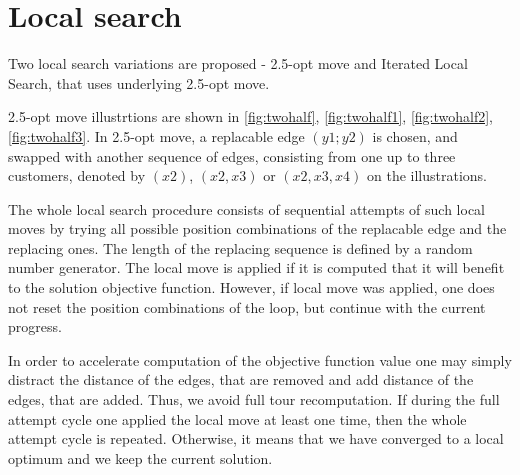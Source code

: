 \documentclass[11pt,a4paper,oneside]{book}
\begin{document}
\section{Local search}

Two local search variations are proposed - 2.5-opt move \cite{Stattenberger2007} and Iterated Local Search, that uses underlying 2.5-opt move. 

2.5-opt move illustrtions are shown in \ref{fig:twohalf}, \ref{fig:twohalf1}, \ref{fig:twohalf2}, \ref{fig:twohalf3}. In 2.5-opt move, a replacable edge $(y1;y2)$ is chosen, and swapped with another sequence of edges, consisting from one up to three customers, denoted by $(x2)$, $(x2,x3)$ or $(x2,x3,x4)$ on the illustrations.

The whole local search procedure consists of sequential attempts of such local moves by trying all possible position combinations of the replacable edge and the replacing ones. The length of the replacing sequence is defined by a random number generator. The local move is applied if it is computed that it will benefit to the solution objective function. However, if local move was applied, one does not reset the position combinations of the loop, but continue with the current progress.

In order to accelerate computation of the objective function value one may simply distract the distance of the edges, that are removed and add distance of the edges, that are added. Thus, we avoid full tour recomputation. If during the full attempt cycle one applied the local move at least one time, then the whole attempt cycle is repeated. Otherwise, it means that we have converged to a local optimum and we keep the current solution.
\end{document}
